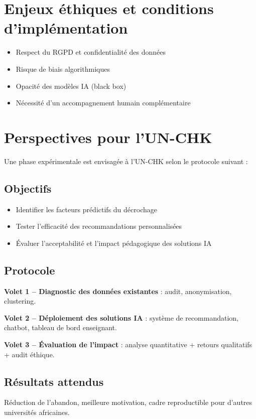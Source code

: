 \documentclass[12pt]{article}
\begin{document}
\section{Enjeux éthiques et conditions d’implémentation}
\begin{itemize}
  \item Respect du RGPD et confidentialité des données
  \item Risque de biais algorithmiques
  \item Opacité des modèles IA (black box)
  \item Nécessité d’un accompagnement humain complémentaire
\end{itemize}

\section{Perspectives pour l’UN-CHK}
Une phase expérimentale est envisagée à l’UN-CHK selon le protocole suivant :

\subsection*{Objectifs}
\begin{itemize}
  \item Identifier les facteurs prédictifs du décrochage
  \item Tester l’efficacité des recommandations personnalisées
  \item Évaluer l’acceptabilité et l’impact pédagogique des solutions IA
\end{itemize}

\subsection*{Protocole}
\textbf{Volet 1 – Diagnostic des données existantes} : audit, anonymisation, clustering.

\textbf{Volet 2 – Déploiement des solutions IA} : système de recommandation, chatbot, tableau de bord enseignant.

\textbf{Volet 3 – Évaluation de l’impact} : analyse quantitative + retours qualitatifs + audit éthique.

\subsection*{Résultats attendus}
Réduction de l’abandon, meilleure motivation, cadre reproductible pour d'autres universités africaines.
\end{document}
